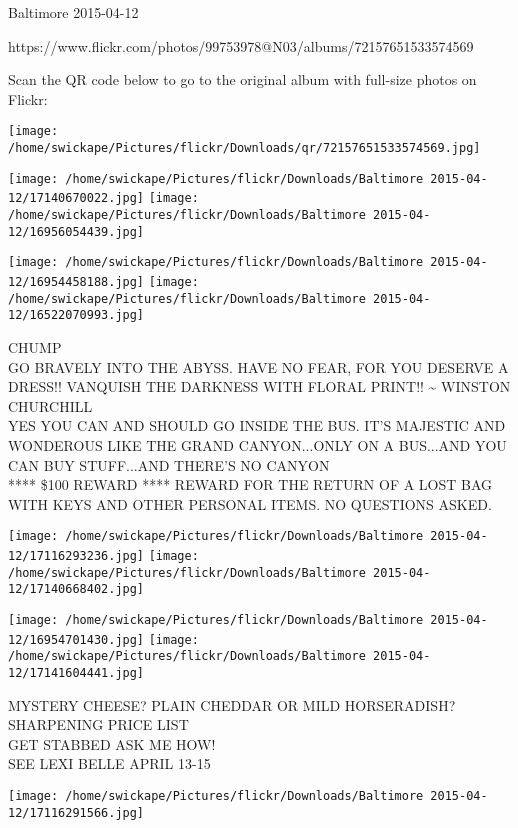 \documentclass[10pt,letterpaper]{article}
\begin{document}
Baltimore 2015-04-12

https://www.flickr.com/photos/99753978@N03/albums/72157651533574569

Scan the QR code below to go to the original album with full-size photos on Flickr:

\texttt{[image: /home/swickape/Pictures/flickr/Downloads/qr/72157651533574569.jpg]}
\pagebreak

\texttt{[image: /home/swickape/Pictures/flickr/Downloads/Baltimore 2015-04-12/17140670022.jpg]}
\texttt{[image: /home/swickape/Pictures/flickr/Downloads/Baltimore 2015-04-12/16956054439.jpg]}

\texttt{[image: /home/swickape/Pictures/flickr/Downloads/Baltimore 2015-04-12/16954458188.jpg]}
\texttt{[image: /home/swickape/Pictures/flickr/Downloads/Baltimore 2015-04-12/16522070993.jpg]}

CHUMP\\
GO BRAVELY INTO THE ABYSS.  HAVE NO FEAR, FOR YOU DESERVE A DRESS!!  VANQUISH THE DARKNESS WITH FLORAL PRINT!!  \textasciitilde{} WINSTON CHURCHILL\\
YES YOU CAN AND SHOULD GO INSIDE THE BUS.  IT'S MAJESTIC AND WONDEROUS LIKE THE GRAND CANYON...ONLY ON A BUS...AND YOU CAN BUY STUFF...AND THERE'S NO CANYON\\
**** \$100 REWARD **** REWARD FOR THE RETURN OF A LOST BAG WITH KEYS AND OTHER PERSONAL ITEMS.  NO QUESTIONS ASKED.\\
\pagebreak

\texttt{[image: /home/swickape/Pictures/flickr/Downloads/Baltimore 2015-04-12/17116293236.jpg]}
\texttt{[image: /home/swickape/Pictures/flickr/Downloads/Baltimore 2015-04-12/17140668402.jpg]}

\texttt{[image: /home/swickape/Pictures/flickr/Downloads/Baltimore 2015-04-12/16954701430.jpg]}
\texttt{[image: /home/swickape/Pictures/flickr/Downloads/Baltimore 2015-04-12/17141604441.jpg]}

MYSTERY CHEESE?  PLAIN CHEDDAR OR MILD HORSERADISH?\\
SHARPENING PRICE LIST\\
GET STABBED ASK ME HOW!\\
SEE LEXI BELLE APRIL 13{-}15\\
\pagebreak

\texttt{[image: /home/swickape/Pictures/flickr/Downloads/Baltimore 2015-04-12/17116291566.jpg]}
\end{document}
